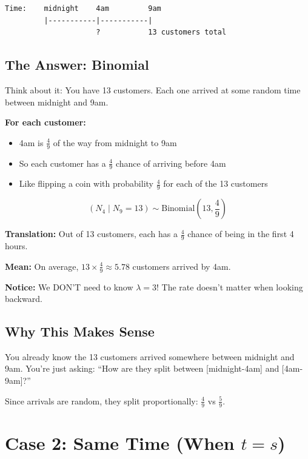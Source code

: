 \documentclass[11pt]{article}
\begin{document}
\begin{verbatim}
Time:    midnight    4am         9am
         |-----------|-----------|
                     ?           13 customers total
\end{verbatim}

\subsection{The Answer: Binomial}

Think about it: You have 13 customers. Each one arrived at some random time between midnight and 9am.

\textbf{For each customer:}
\begin{itemize}
    \item 4am is $\frac{4}{9}$ of the way from midnight to 9am
    \item So each customer has a $\frac{4}{9}$ chance of arriving before 4am
    \item Like flipping a coin with probability $\frac{4}{9}$ for each of the 13 customers
\end{itemize}

\begin{tcolorbox}[colback=green!10!white,colframe=green!75!black,title=Answer for Case 1]
\[
(N_4 \mid N_9 = 13) \sim \text{Binomial}\left(13, \frac{4}{9}\right)
\]

\textbf{Translation:} Out of 13 customers, each has a $\frac{4}{9}$ chance of being in the first 4 hours.

\textbf{Mean:} On average, $13 \times \frac{4}{9} \approx 5.78$ customers arrived by 4am.

\textbf{Notice:} We DON'T need to know $\lambda = 3$! The rate doesn't matter when looking backward.
\end{tcolorbox}

\subsection{Why This Makes Sense}

You already know the 13 customers arrived somewhere between midnight and 9am. You're just asking: ``How are they split between [midnight-4am] and [4am-9am]?''

Since arrivals are random, they split proportionally: $\frac{4}{9}$ vs $\frac{5}{9}$.

\section{Case 2: Same Time (When $t = s$)}
\end{document}
